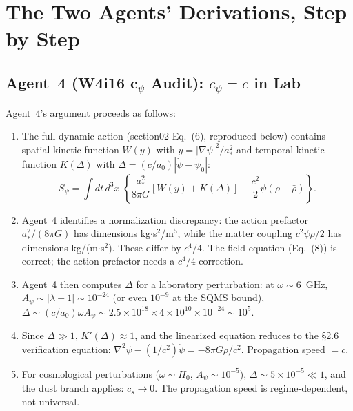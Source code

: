 \documentclass[11pt]{article}
\newcommand{\ee}[1]{\times 10^{#1}}
\begin{document}
\section{The Two Agents' Derivations, Step by Step}

\subsection{Agent~4 (W4i16 c$_\psi$ Audit): $c_\psi = c$ in Lab}

Agent~4's argument proceeds as follows:

\begin{enumerate}
\item The full dynamic action (section02 Eq.~(6), reproduced below)
  contains spatial kinetic function $W(y)$ with $y = |\nabla\psi|^2/a_*^2$
  and temporal kinetic function $K(\Delta)$ with $\Delta =
  (c/a_0)|\dot\psi - \dot\psi_0|$:
  \begin{equation}
  S_\psi = \int dt\,d^3x\;\left\{
    \frac{a_*^2}{8\pi G}\left[
      W(y) + K(\Delta)
    \right] - \frac{c^2}{2}\psi(\rho - \bar\rho)
  \right\}.
  \end{equation}

\item Agent~4 identifies a normalization discrepancy: the action prefactor
  $a_*^2/(8\pi G)$ has dimensions kg$\cdot$s$^2$/m$^5$, while the matter
  coupling $c^2\psi\rho/2$ has dimensions kg/(m$\cdot$s$^2$). These
  differ by $c^4/4$. The field equation (Eq.~(8)) is correct; the action
  prefactor needs a $c^4/4$ correction.

\item Agent~4 then computes $\Delta$ for a laboratory perturbation:
  at $\omega \sim 6$~GHz, $A_\psi \sim |\lambda-1| \sim 10^{-24}$
  (or even $10^{-9}$ at the SQMS bound), $\Delta \sim (c/a_0)\omega
  A_\psi \sim 2.5\ee{18} \times 4\ee{10} \times 10^{-24} \sim 10^5$.

\item Since $\Delta \gg 1$, $K'(\Delta) \approx 1$, and the linearized
  equation reduces to the \S2.6 verification equation:
  $\nabla^2\psi - (1/c^2)\ddot\psi = -8\pi G\rho/c^2$.
  Propagation speed $= c$.

\item For cosmological perturbations ($\omega \sim H_0$, $A_\psi \sim
  10^{-5}$), $\Delta \sim 5\ee{-5} \ll 1$, and the dust branch applies:
  $c_s \to 0$. The propagation speed is regime-dependent, not universal.
\end{enumerate}
\end{document}
